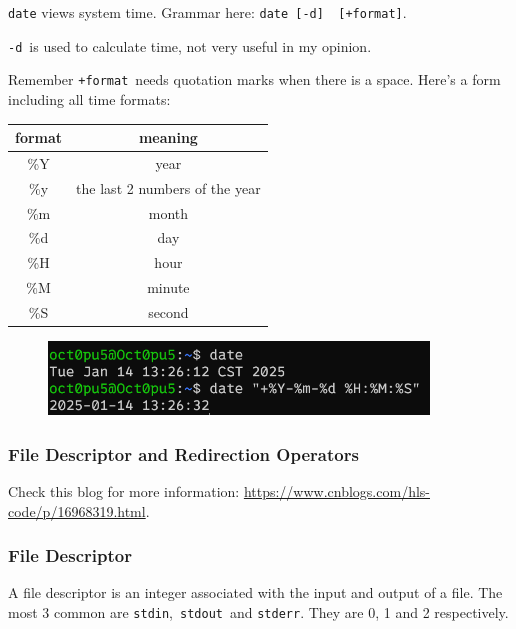 \documentclass[12pt]{ctexart}
\newenvironment{mdquote}
{%
  \par\noindent
  \begin{list}{}{%
      \setlength{\leftmargin}{1em}%
      \setlength{\rightmargin}{0pt}%
      \setlength{\itemindent}{0pt}%
      \setlength{\listparindent}{\parindent}%
      \setlength{\topsep}{0.5\baselineskip}%
  }
  \item[\textbf{>}\ ]\itshape
}
{\end{list}\par}
\begin{document}
\texttt{date} views system time. Grammar here:
\texttt{date\ {[}-d{]}\ \ {[}+format{]}}.

\texttt{-d}\ is used to calculate time, not very useful in my opinion.

Remember \texttt{+format}\ needs quotation marks when there is a space.
Here's a form including all time formats:

\begin{table}[H]
    \centering
    \begin{tabular}{cc}
    \toprule
    format & meaning \\
    \midrule
    \%Y & year \\
    \%y & the last 2 numbers of the year \\
    \%m & month \\
    \%d & day \\
    \%H & hour \\
    \%M & minute \\
    \%S & second \\
    \bottomrule
    \end{tabular}
\end{table}

\begin{figure}[H]
    \centering
    \includegraphics[width=0.9\textwidth,keepaspectratio]{assets/Linux/1.8 Some trivial contents on Linux/3.png}
\end{figure}

\subsubsection{\textbf{File Descriptor and Redirection Operators}}

\begin{mdquote}
Check this blog for more information: \url{https://www.cnblogs.com/hls-code/p/16968319.html}.
\end{mdquote}

\subsubsection*{\textbf{File Descriptor}}

A file descriptor is an integer associated with the input and output of a file.
The most 3 common are \texttt{stdin},\ \texttt{stdout}\ and \texttt{stderr}. 
They are 0, 1 and 2 respectively.
\end{document}
